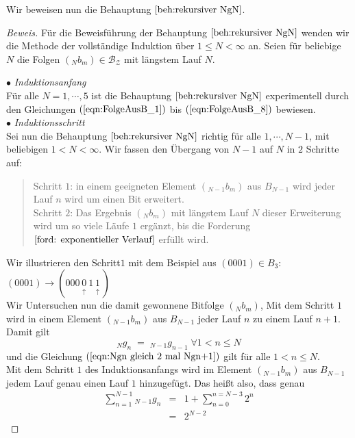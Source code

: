 \documentclass[11pt,oneside,a4paper]{scrreprt}
\newenvironment{bew}{\begin{proof}[Beweis]}{\end{proof}}
\begin{document}
\noindent Wir beweisen nun die Behauptung $\ref{beh:rekursiver NgN}$.
\begin{bew} Für die Beweisführung der Behauptung $\ref{beh:rekursiver NgN}$ wenden wir die Methode der vollständige Induktion über $1\leq N<\infty$ an.
Seien für beliebige $N$ die Folgen $(_Nb_m)\in\mathcal{B_Z}$ mit längstem Lauf $N$. 

\indent $\bullet$ \emph{Induktionsanfang}\\
Für alle $N=1,\cdots,5$ ist die Behauptung $\ref{beh:rekursiver NgN}$ experimentell durch den Gleichungen $(\ref{eqn:FolgeAusB_1})$ bis $(\ref{eqn:FolgeAusB_8})$ bewiesen.\\ 
\indent $\bullet$ \emph{Induktionsschritt}\\
Sei nun die Behauptung $\ref{beh:rekursiver NgN}$ richtig für alle $1,\cdots,N-1$, mit beliebigen $1<N<\infty$. Wir fassen den Übergang von $N-1$ auf $N$ in $2$ Schritte auf: 
\begin{quote}
	Schritt $1$: in einem geeigneten Element $(_{N-1}b_m)$ aus $B_{N-1}$ wird jeder Lauf $n$ wird um einen Bit erweitert.\\
	Schritt $2$: Das Ergebnis $(_Nb_m)$ mit längstem Lauf $N$ dieser Erweiterung wird um so viele Läufe $1$ ergänzt, bis die Forderung $\ref{ford: exponentieller Verlauf}$ erfüllt wird. 
\end{quote}
Wir illustrieren den Schritt$1$ mit dem Beispiel aus $(0001)\in B_3$: \indent
$(0001) \rightarrow ( 000\underset{\substack{\uparrow}}{0}1\underset{\substack{\uparrow}}{1} )$\\
Wir Untersuchen nun die damit gewonnene Bitfolge $(_Nb_m)$,
Mit dem Schritt $1$ wird in einem Element $(_{N-1}b_m)$ aus $B_{N-1}$ jeder Lauf $n$ zu einem Lauf $n+1$. Damit gilt
\begin{equation}
_Ng_n\;=\;_{N-1}g_{n-1}\; \forall 1<n\leq N
\end{equation}
und die Gleichung $(\ref{eqn:Ngn gleich 2 mal Ngn+1})$ gilt für alle $1<n\leq N$.\\
Mit dem Schritt $1$ des Induktionsanfangs wird im Element $(_{N-1}b_m)$ aus $B_{N-1}$ jedem Lauf genau einen Lauf $1$ hinzugefügt. Das heißt also, dass genau
\begin{eqnarray}\label{eqn: Anzahl der Läufe in B_N-1}
\sum_{n=1}^{N-1}{_{N-1}}g_n&=&1+\sum_{n=0}^{n=N-3}2^n\\
&=&2^{N-2}
\end{eqnarray}

\end{bew}
\end{document}
